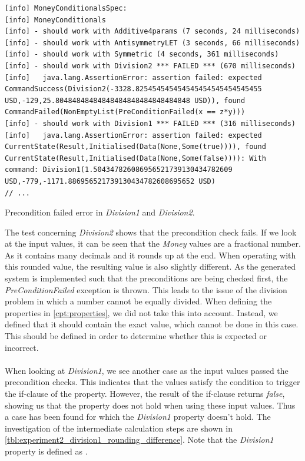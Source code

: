 \begin{sourcecode}[!ht]
\begin{lstlisting}[language=Log]
[info] MoneyConditionalsSpec:
[info] MoneyConditionals
[info] - should work with Additive4params (7 seconds, 24 milliseconds)
[info] - should work with AntisymmetryLET (3 seconds, 66 milliseconds)
[info] - should work with Symmetric (4 seconds, 361 milliseconds)
[info] - should work with Division2 *** FAILED *** (670 milliseconds)
[info]   java.lang.AssertionError: assertion failed: expected CommandSuccess(Division2(-3328.825454545454545454545454545455 USD,-129,25.80484848484848484848484848484848 USD)), found CommandFailed(NonEmptyList(PreConditionFailed(x == z*y)))
[info] - should work with Division1 *** FAILED *** (316 milliseconds)
[info]   java.lang.AssertionError: assertion failed: expected CurrentState(Result,Initialised(Data(None,Some(true)))), found CurrentState(Result,Initialised(Data(None,Some(false)))): With command: Division1(1.504347826086956521739130434782609 USD,-779,-1171.886956521739130434782608695652 USD)
// ...
\end{lstlisting}
\caption{Precondition failed error in \textit{Division1} and \textit{Division2}.}
\label{lst:experiment2_log_second_run}
\end{sourcecode}
\FloatBarrier\noindent
The test concerning \textit{Division2} shows that the precondition check fails.
If we look at the input values, it can be seen that the \textit{Money} values
are a fractional number. As it contains many decimals and it rounds up at the
end. When operating with this rounded value, the resulting value is also
slightly different. As the generated system is implemented such that the
preconditions are being checked first, the \textit{PreConditionFailed} exception
is thrown. This leads to the issue of the division problem in which a number
cannot be equally divided. When defining the properties in
\autoref{cpt:properties}, we did not take this into account. Instead, we defined
that it should contain the exact value, which cannot be done in this case. This
should be defined in order to determine whether this is expected or incorrect.\\
\\
When looking at \textit{Division1}, we see another case as the input values
passed the precondition checks. This indicates that the values satisfy the
condition to trigger the if-clause of the property. However, the result of the
if-clause returns \textit{false}, showing us that the property does not hold
when using these input values. Thus a case has been found for which the
\textit{Division1} property doesn't hold. The investigation of the intermediate
calculation steps are shown in
\autoref{tbl:experiment2_division1_rounding_difference}. Note that the
\textit{Division1} property is defined as .

